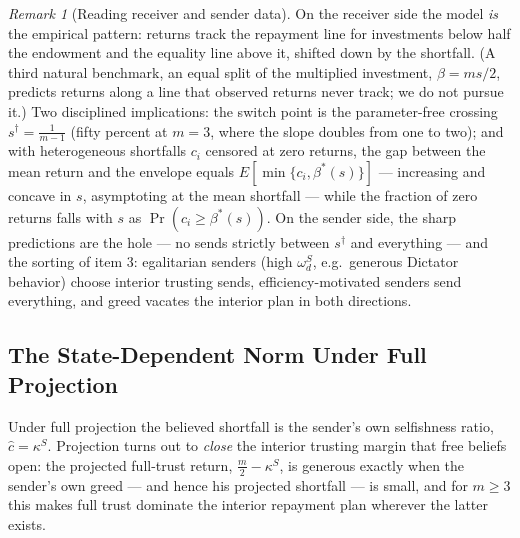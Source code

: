 \documentclass[11pt]{article}
\theoremstyle{plain}
\theoremstyle{remark}
\newtheorem{remark}{Remark}
\begin{document}
\begin{remark}[Reading receiver and sender data]
On the receiver side the model \emph{is} the empirical pattern: returns track the repayment line for investments below half the endowment and the equality line above it, shifted down by the shortfall.  (A third natural benchmark, an equal split of the multiplied investment, $\beta=ms/2$, predicts returns along a line that observed returns never track; we do not pursue it.)  Two disciplined implications: the switch point is the parameter-free crossing $s^\dagger=\frac1{m-1}$ (fifty percent at $m=3$, where the slope doubles from one to two); and with heterogeneous shortfalls $c_i$ censored at zero returns, the gap between the mean return and the envelope equals $E[\min\{c_i,\beta^\ast(s)\}]$ --- increasing and concave in $s$, asymptoting at the mean shortfall --- while the fraction of zero returns falls with $s$ as $\Pr(c_i\ge\beta^\ast(s))$.  On the sender side, the sharp predictions are the hole --- no sends strictly between $s^\dagger$ and everything --- and the sorting of item 3: egalitarian senders (high $\omega_d^S$, e.g.\ generous Dictator behavior) choose interior trusting sends, efficiency-motivated senders send everything, and greed vacates the interior plan in both directions.
\end{remark}

\subsection{The State-Dependent Norm Under Full Projection}

Under full projection the believed shortfall is the sender's own selfishness ratio, $\hat c=\kappa^S$.  Projection turns out to \emph{close} the interior trusting margin that free beliefs open: the projected full-trust return, $\tfrac m2-\kappa^S$, is generous exactly when the sender's own greed --- and hence his projected shortfall --- is small, and for $m\ge3$ this makes full trust dominate the interior repayment plan wherever the latter exists.
\end{document}

